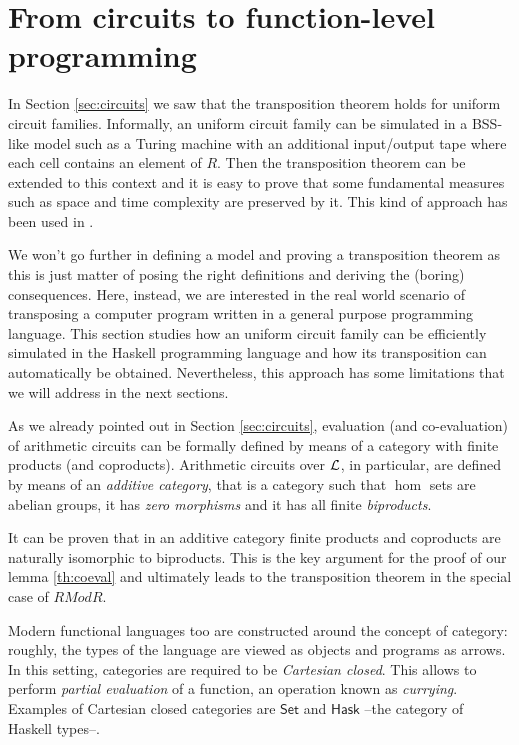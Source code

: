 \section{From circuits to function-level programming}
\label{sec:fp}
\lstset{language=haskell}

In Section \ref{sec:circuits} we saw that the transposition theorem
holds for uniform circuit families.  Informally, an uniform circuit
family can be simulated in a BSS-like model \cite{BSS} such as a
Turing machine with an additional input/output tape where each cell
contains an element of $R$. Then the transposition theorem can be
extended to this context and it is easy to prove that some fundamental
measures such as space and time complexity are preserved by it. This
kind of approach has been used in \cite{BoLeSc03}.

We won't go further in defining a model and proving a transposition
theorem as this is just matter of posing the right definitions and
deriving the (boring) consequences. Here, instead, we are interested
in the real world scenario of transposing a computer program written
in a general purpose programming language. This section studies how an
uniform circuit family can be efficiently simulated in the Haskell
programming language and how its transposition can automatically be
obtained. Nevertheless, this approach has some limitations that we
will address in the next sections.

As we already pointed out in Section \ref{sec:circuits}, evaluation
(and co-evaluation) of arithmetic circuits can be formally defined by
means of a category with finite products (and coproducts). Arithmetic
circuits over $\mathcal{L}$, in particular, are defined by means of an
\emph{additive category}, that is a category such that $\hom$ sets are
abelian groups, it has \emph{zero morphisms} and it has all finite
\emph{biproducts}.

It can be proven \cite[VIII.2]{McLane} that in an additive category
finite products and coproducts are naturally isomorphic to biproducts.
This is the key argument for the proof of our lemma \ref{th:coeval}
and ultimately leads to the transposition theorem in the special case
of $RMod{R}$.

Modern functional languages too are constructed around the concept of
category: roughly, the types of the language are viewed as objects and
programs as arrows. In this setting, categories are required to be
\emph{Cartesian closed}. This allows to perform \emph{partial
  evaluation} of a function, an operation known as
\emph{currying}. Examples of Cartesian closed categories are
$\mathsf{Set}$ and $\mathsf{Hask}$ --the category of Haskell types--.

